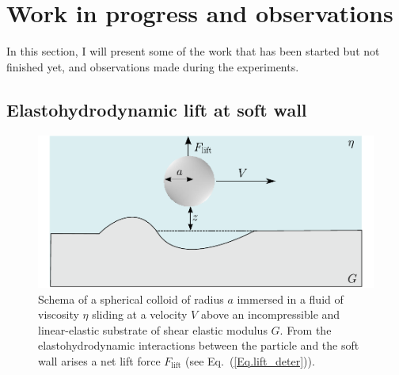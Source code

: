 \section{Work in progress and observations}

In this section, I will present some of the work that has been started but not finished yet, and observations made during the experiments.

\subsection{Elastohydrodynamic lift at soft wall}

\begin{figure}[H]
	\centering
	\includegraphics{02_body/chapter4/images/EHD_forces/drawing_system.pdf}
	\caption{Schema of a spherical colloid of radius $a$  immersed in a fluid of viscosity $\eta$ sliding at a velocity $V$ above an incompressible and linear-elastic substrate of shear elastic modulus $G$. From the elastohydrodynamic interactions between the particle and the soft wall arises a net lift force $F_\mathrm{lift}$ (see Eq.~(\ref{Eq.lift_deter})).}
	\label{fig.shema_EHD}
\end{figure}




